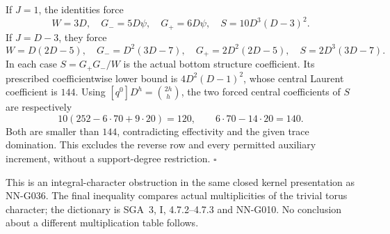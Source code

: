 If $J=1$, the identities force
\[
 W=3D,\quad G_-=5D\psi,\quad G_+=6D\psi,\quad
 S=10D^3(D-3)^2.
\]
If $J=D-3$, they force
\[
 W=D(2D-5),\quad G_-=D^2(3D-7),\quad
 G_+=2D^2(2D-5),\quad S=2D^3(3D-7).
\]
In each case $S=G_+G_-/W$ is the actual bottom
structure coefficient. Its prescribed coefficientwise
lower bound is $4D^2(D-1)^2$, whose central Laurent
coefficient is $144$.
Using $[q^0]D^h=\binom{2h}{h}$, the two forced
central coefficients of $S$ are respectively
\[
 10(252-6\cdot70+9\cdot20)=120,\qquad
                    6\cdot70-14\cdot20=140.
\]
Both are smaller than $144$, contradicting effectivity
and the given trace domination. This excludes the reverse
row and every permitted auxiliary increment, without a
support-degree restriction.
\hfill$\square$

This is an integral-character obstruction in the same
closed kernel presentation as NN-G036. The final inequality
compares actual multiplicities of the trivial torus character;
the dictionary is SGA~3, I, 4.7.2--4.7.3 and NN-G010.
No conclusion about a different multiplication table follows.

